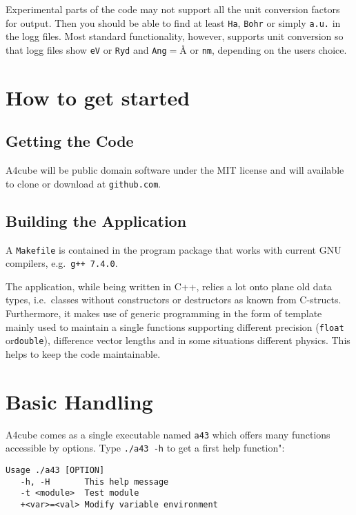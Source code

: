 \documentclass[oribibl]{llncs}
\newcommand{\ttt}[1]{\texttt{#1}}
\newcommand{\codename}{A4cube}
\begin{document}
Experimental parts of the code may not support all the unit conversion
factors for output. Then you should be able to find at least \ttt{Ha}, \ttt{Bohr} or simply \ttt{a.u.} in the logg files.
Most standard functionality, however, supports unit conversion so that logg files
show \ttt{eV} or \ttt{Ryd} and \ttt{Ang}$ = $\AA{} or \ttt{nm}, depending on the users choice.


\section{How to get started}

\subsection{Getting the Code}
\codename{} will be public domain software under the MIT license
and will available to clone or download at \ttt{github.com}. 

\subsection{Building the Application} \label{sec:compiling}
A \ttt{Makefile} is contained in the program package that works with current GNU compilers, e.g.~\ttt{g++ 7.4.0}.

The application, while being written in C++, relies a lot onto plane old data types, i.e.~classes without constructors or destructors as known from C-structs.
Furthermore, it makes use of generic programming in the form of template
mainly used to maintain a single functions supporting different precision (\ttt{float} or\ttt{double}), difference vector lengths and in some situations different physics. This helps to keep the code maintainable.

\section{Basic Handling}
\codename{} comes as a single executable named \ttt{a43} which
offers many functions accessible by options. Type \ttt{./a43 -h}
to get a first help function":
\begin{verbatim}
Usage ./a43 [OPTION]
   -h, -H      	This help message
   -t <module> 	Test module
   +<var>=<val>	Modify variable environment
\end{verbatim}
\end{document}
